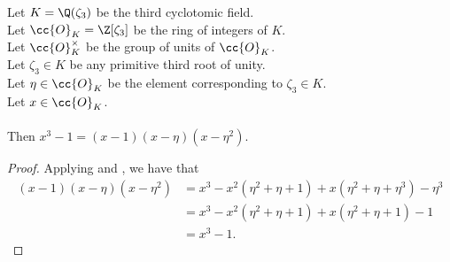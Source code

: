 \begin{lemma}
    \label{lmm:cube_sub_one}
    \leanok
    Let $K = \Q(\zeta_3)$ be the third cyclotomic field. \\
    Let $\cc{O}_K = \Z[\zeta_3]$ be the ring of integers of $K$. \\
    Let $\cc{O}^\times_K$ be the group of units of $\cc{O}_K$. \\
    Let $\zeta_3 \in K$ be any primitive third root of unity. \\
    Let $\eta \in \cc{O}_K$ be the element corresponding to $\zeta_3 \in K$. \\
    Let $x \in \cc{O}_K$. \\\\
    Then $x^3 - 1 = (x - 1)(x - \eta)(x - \eta^ 2)$.
\end{lemma}
\begin{proof}
    \leanok
    Applying  and , we have that
    \begin{align*}
        (x - 1)(x - \eta)(x - \eta^ 2)
        &= x^3 - x^2 (\eta^2 + \eta + 1) + x (\eta^2 + \eta + \eta^3) - \eta^3 \\
        &= x^3 - x^2 (\eta^2 + \eta + 1) + x (\eta^2 + \eta + 1) - 1 \\
        &= x^3 - 1.
    \end{align*}
\end{proof}

